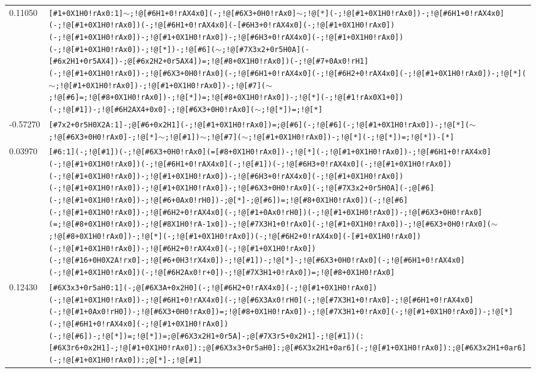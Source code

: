 \begin{longtable}{>{\baselineskip=10pt}p{} >{\baselineskip=10pt}p{}}
0.11050 & \texttt{[\#1+0X1H0!rAx0:1]$\sim$;!@[\#6H1+0!rAX4x0](-;!@[\#6X3+0H0!rAx0]$\sim$;!@[*](-;!@[\#1+0X1H0!rAx0])-;!@[\#6H1+0!rAX4x0](-;!@[\#1+0X1H0!rAx0])(-;!@[\#6H1+0!rAX4x0](-[\#6H3+0!rAX4x0](-;!@[\#1+0X1H0!rAx0])(-;!@[\#1+0X1H0!rAx0])-;!@[\#1+0X1H0!rAx0])-;!@[\#6H3+0!rAX4x0](-;!@[\#1+0X1H0!rAx0])(-;!@[\#1+0X1H0!rAx0])-;!@[*])-;!@[\#6]($\sim$;!@[\#7X3x2+0r5H0A](-[\#6x2H1+0r5AX4])-;@[\#6x2H2+0r5AX4])=;!@[\#8+0X1H0!rAx0])(-;!@[\#7+0Ax0!rH1](-;!@[\#1+0X1H0!rAx0])-;!@[\#6X3+0H0!rAx0](-;!@[\#6H1+0!rAX4x0](-;!@[\#6H2+0!rAX4x0](-;!@[\#1+0X1H0!rAx0])-;!@[*]($\sim$;!@[\#1+0X1H0!rAx0])-;!@[\#1+0X1H0!rAx0])-;!@[\#7]($\sim$;!@[\#6]=;!@[\#8+0X1H0!rAx0])-;!@[*])=;!@[\#8+0X1H0!rAx0])-;!@[*](-;!@[\#1!rAx0X1+0])(-;!@[\#1])-;!@[\#6H2AX4+0x0]-;!@[\#6X3+0H0!rAx0]($\sim$;!@[*])=;!@[*]} \\ 
-0.57270 & \texttt{[\#7x2+0r5H0X2A:1]-;@[\#6+0x2H1](-;!@[\#1+0X1H0!rAx0])=;@[\#6](-;!@[\#6](-;!@[\#1+0X1H0!rAx0])-;!@[*]($\sim$;!@[\#6X3+0H0!rAx0]-;!@[*]$\sim$;!@[\#1])$\sim$;!@[\#7]($\sim$;!@[\#1+0X1H0!rAx0])-;!@[*](-;!@[*])=;!@[*])-[*]} \\ 
0.03970 & \texttt{[\#6:1](-;!@[\#1])(-;!@[\#6X3+0H0!rAx0](=[\#8+0X1H0!rAx0])-;!@[*](-;!@[\#1+0X1H0!rAx0])-;!@[\#6H1+0!rAX4x0](-;!@[\#1+0X1H0!rAx0])(-;!@[\#6H1+0!rAX4x0](-;!@[\#1])(-;!@[\#6H3+0!rAX4x0](-;!@[\#1+0X1H0!rAx0])(-;!@[\#1+0X1H0!rAx0])-;!@[\#1+0X1H0!rAx0])-;!@[\#6H3+0!rAX4x0](-;!@[\#1+0X1H0!rAx0])(-;!@[\#1+0X1H0!rAx0])-;!@[\#1+0X1H0!rAx0])-;!@[\#6X3+0H0!rAx0](-;!@[\#7X3x2+0r5H0A](-;@[\#6](-;!@[\#1+0X1H0!rAx0])-;!@[\#6+0Ax0!rH0])-;@[*]-;@[\#6])=;!@[\#8+0X1H0!rAx0])(-;!@[\#6](-;!@[\#1+0X1H0!rAx0])-;!@[\#6H2+0!rAX4x0](-;!@[\#1+0Ax0!rH0])(-;!@[\#1+0X1H0!rAx0])-;!@[\#6X3+0H0!rAx0](=;!@[\#8+0X1H0!rAx0])-;!@[\#8X1H0!rA-1x0])-;!@[\#7X3H1+0!rAx0](-;!@[\#1+0X1H0!rAx0])-;!@[\#6X3+0H0!rAx0]($\sim$;!@[\#8+0X1H0!rAx0])-;!@[*](-;!@[\#1+0X1H0!rAx0])(-;!@[\#6H2+0!rAX4x0](-[\#1+0X1H0!rAx0])(-;!@[\#1+0X1H0!rAx0])-;!@[\#6H2+0!rAX4x0](-;!@[\#1+0X1H0!rAx0])(-;!@[\#16+0H0X2A!rx0]-;!@[\#6+0H3!rX4x0])-;!@[\#1])-;!@[*]-;!@[\#6X3+0H0!rAx0](-;!@[\#6H1+0!rAX4x0](-;!@[\#1+0X1H0!rAx0])(-;!@[\#6H2Ax0!r+0])-;!@[\#7X3H1+0!rAx0])=;!@[\#8+0X1H0!rAx0]} \\ 
0.12430 & \texttt{[\#6X3x3+0r5aH0:1](-;@[\#6X3A+0x2H0](-;!@[\#6H2+0!rAX4x0](-;!@[\#1+0X1H0!rAx0])(-;!@[\#1+0X1H0!rAx0])-;!@[\#6H1+0!rAX4x0](-;!@[\#6X3Ax0!rH0](-;!@[\#7X3H1+0!rAx0]-;!@[\#6H1+0!rAX4x0](-;!@[\#1+0Ax0!rH0])-;!@[\#6X3+0H0!rAx0])=;!@[\#8+0X1H0!rAx0])-;!@[\#7X3H1+0!rAx0](-;!@[\#1+0X1H0!rAx0])-;!@[*](-;!@[\#6H1+0!rAX4x0](-;!@[\#1+0X1H0!rAx0])(-;!@[\#6])-;!@[*])=;!@[*])=;@[\#6X3x2H1+0r5A]-;@[\#7X3r5+0x2H1]-;!@[\#1])(:[\#6X3r6+0x2H1]-;!@[\#1+0X1H0!rAx0]):;@[\#6X3x3+0r5aH0]:;@[\#6X3x2H1+0ar6](-;!@[\#1+0X1H0!rAx0]):;@[\#6X3x2H1+0ar6](-;!@[\#1+0X1H0!rAx0]):;@[*]-;!@[\#1]} \\ 

\end{longtable}

